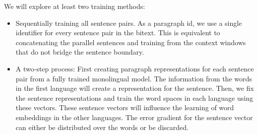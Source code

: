 We will explore at least two training methods:
\begin{itemize}
\item 
	Sequentially training all sentence pairs. As a paragraph id, we use a single identifier for every sentence pair in the bitext.
	This is equivalent to concatenating the parallel sentences and training from the context windows that do not bridge the sentence boundary.
\item 
	A two-step process:
	First creating paragraph representations for each sentence pair from a fully trained monolingual model. The information from the words in the first language will create a representation for the sentence.
	Then, we fix the sentence representations and train the word spaces in each language using these vectors.
	These sentence vectors will influence the learning of word embeddings in the other languages.
	The error gradient for the sentence vector can either be distributed over the words or be discarded.
\end{itemize}
